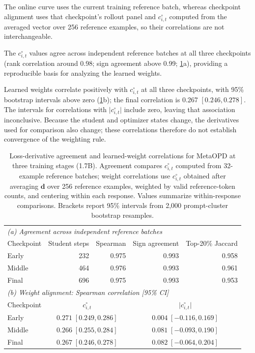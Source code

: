 \documentclass{article}
\theoremstyle{plain}
\theoremstyle{definition}
\theoremstyle{remark}
\begin{document}
The online curve uses the current training reference batch, whereas checkpoint alignment uses that checkpoint's rollout panel and \(c^\circ_{i,t}\) computed from the averaged vector over 256 reference examples, so their correlations are not interchangeable.

The \(c^\circ_{i,t}\) values agree across independent reference batches at all three checkpoints (rank correlation around 0.98; sign agreement above 0.99; \cref{tab:trained-credit}a), providing a reproducible basis for analyzing the learned weights.

Learned weights correlate positively with \(c^\circ_{i,t}\) at all three checkpoints, with 95\% bootstrap intervals above zero (\cref{tab:trained-credit}b); the final correlation is 0.267 \([0.246,0.278]\). The intervals for correlations with \(\lvert c^\circ_{i,t}\rvert\) include zero, leaving that association inconclusive. Because the student and optimizer states change, the derivatives used for comparison also change; these correlations therefore do not establish convergence of the weighting rule.


\begin{table}[htbp]
\centering
\small
\caption{Loss-derivative agreement and learned-weight correlations for MetaOPD at three training stages (1.7B). Agreement compares \(c^\circ_{i,t}\) computed from 32-example reference batches; weight correlations use \(c^\circ_{i,t}\) obtained after averaging \(\boldsymbol d\) over 256 reference examples, weighted by valid reference-token counts, and centering within each response. Values summarize within-response comparisons. Brackets report 95\% intervals from 2,000 prompt-cluster bootstrap resamples.}
\label{tab:trained-credit}
\begin{tabular}{@{}lrrrr@{}}
\toprule
\multicolumn{5}{l}{\textit{(a) Agreement across independent reference batches}} \\
Checkpoint & Student steps & Spearman & Sign agreement & Top-20\% Jaccard \\
\midrule
Early & 232 & 0.975 & 0.993 & 0.958 \\
Middle & 464 & 0.976 & 0.993 & 0.961 \\
Final & 696 & 0.975 & 0.993 & 0.953 \\
\midrule
\multicolumn{5}{l}{\textit{(b) Weight alignment: Spearman correlation [95\% CI]}} \\
Checkpoint & \multicolumn{2}{c}{\(c^\circ_{i,t}\)} & \multicolumn{2}{c}{\(\lvert c^\circ_{i,t}\rvert\)} \\
\midrule
Early & \multicolumn{2}{c}{\(0.271\;[0.249, 0.286]\)} & \multicolumn{2}{c}{\(0.004\;[-0.116, 0.169]\)} \\
Middle & \multicolumn{2}{c}{\(0.266\;[0.255, 0.284]\)} & \multicolumn{2}{c}{\(0.081\;[-0.093, 0.190]\)} \\
Final & \multicolumn{2}{c}{\(0.267\;[0.246, 0.278]\)} & \multicolumn{2}{c}{\(0.082\;[-0.064, 0.204]\)} \\
\bottomrule
\end{tabular}
\end{table}
\end{document}
